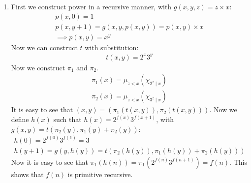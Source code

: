 \begin{enumerate}[label=]
    \item 
        First we construct power in a recursive manner, with $g(x, y, z) = z \times x$:
        \begin{gather*}
            p(x, 0) = 1 \\
            p(x, y + 1) = g(x, y, p(x, y)) = p(x, y) \times x \\
            \implies p(x, y) = x^y
        \end{gather*}
        Now we can construct $t$ with substitution:
        \begin{gather*}
            t(x, y) = 2^x 3^y
        \end{gather*}
        Now we construct $\pi_1$ and $\pi_2$.
        \begin{gather*}
            \pi_1(x) = \mu_{z < x}(\chi_{2^z \mid x}) \\
            \pi_2(x) = \mu_{z < x}(\chi_{3^z \mid x})
        \end{gather*}
        It is easy to see that $(x, y) = (\pi_1(t(x, y)), \pi_2(t(x, y)))$. \newline \newline
        Now we define $h(x)$ such that $h(x) = 2^{f(x)}3^{f(x + 1)}$, with $g(x, y) = t(\pi_2(y), \pi_1(y) + \pi_2(y))$:
        \begin{gather*}
            h(0) = 2^{f(0)} 3^{f(1)} = 3 \\
            h(y + 1) = g(y, h(y)) = t(\pi_2(h(y)), \pi_1(h(y)) + \pi_2(h(y)))
        \end{gather*}
        Now it is easy to see that $\pi_1(h(n)) = \pi_1(2^{f(n)}3^{f(n + 1)}) = f(n)$. This shows that $f(n)$ is primitive recursive.
\end{enumerate}